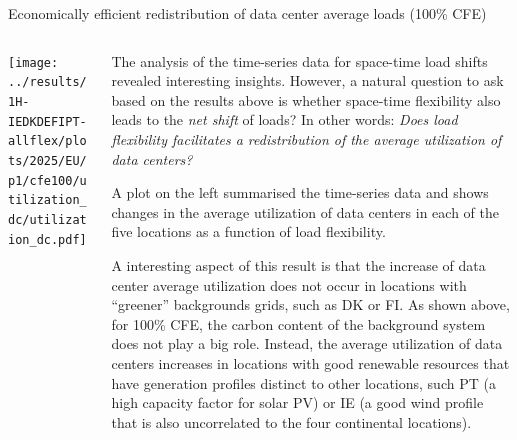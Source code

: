 \begin{frame}{{\normalsize Economically efficient redistribution of data center average loads (100\% CFE)}}
\label{ssec:redistribution}

  {\footnotesize
  
  \begin{columns}[T]
  \begin{column}{6cm}
    \centering
    \texttt{[image: ../results/1H-IEDKDEFIPT-allflex/plots/2025/EU/p1/cfe100/utilization\_dc/utilization\_dc.pdf]} 
  \end{column}

  \begin{column}{8.5cm}

  \vspace{0.3cm}
  The analysis of the time-series data for space-time load shifts revealed interesting insights. However, a natural question to ask based on the results above is whether space-time flexibility also leads to the \textit{net shift} of loads? In other words: \textit{Does load flexibility facilitates a redistribution of the average utilization of data centers?}
  
  \vspace{0.1cm}
  A plot on the left summarised the time-series data and shows changes in the \alert{average utilization} of data centers in each of the five locations as a function of load flexibility.

  \vspace{0.1cm}
  A interesting aspect of this result is that the increase of data center average utilization does not occur in locations with \enquote{greener} backgrounds grids, such as DK or FI. As shown above, for 100\% CFE, the carbon content of the background system does not play a big role. 
  Instead, the average utilization of data centers increases in locations with good renewable resources that have generation profiles distinct to other locations, such PT (a high capacity factor for solar PV) or IE (a good wind profile that is also uncorrelated to the four continental locations). 

  \end{column}
  \end{columns}
  }
\end{frame}


